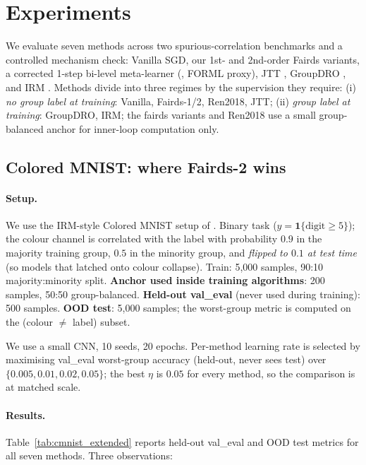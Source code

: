 \section{Experiments}
\label{sec:experiments}

We evaluate seven methods across two spurious-correlation benchmarks
and a controlled mechanism check: Vanilla SGD, our 1st- and 2nd-order
Fairds variants, a corrected 1-step bi-level meta-learner
(\citealt{ren2018reweight}, FORML proxy), JTT \citep{liu2021jtt},
GroupDRO \citep{sagawa2020groupdro}, and IRM \citep{arjovsky2019irm}.
Methods divide into three regimes by the supervision they require:
(i) \emph{no group label at training}: Vanilla, Fairds-1/2, Ren2018,
JTT; (ii) \emph{group label at training}: GroupDRO, IRM; the
fairds variants and Ren2018 use a small group-balanced anchor for
inner-loop computation only.

\subsection{Colored MNIST: where Fairds-2 wins}
\label{sec:exp:cmnist}

\paragraph{Setup.}
We use the IRM-style Colored MNIST setup of \citet{arjovsky2019irm}.
Binary task ($y = \mathbf{1}\{\mathrm{digit} \geq 5\}$); the colour
channel is correlated with the label with probability $0.9$ in the
majority training group, $0.5$ in the minority group, and \emph{flipped
to $0.1$ at test time} (so models that latched onto colour collapse).
Train: 5{,}000 samples, 90:10 majority:minority split.
\textbf{Anchor used inside training algorithms}: 200 samples, 50:50
group-balanced. \textbf{Held-out val\_eval} (never used during training):
500 samples. \textbf{OOD test}: 5{,}000 samples; the worst-group metric
is computed on the (colour $\neq$ label) subset.

We use a small CNN, 10 seeds, 20 epochs. Per-method learning rate is
selected by maximising val\_eval worst-group accuracy (held-out, never
sees test) over $\{0.005, 0.01, 0.02, 0.05\}$; the best $\eta$ is $0.05$
for every method, so the comparison is at matched scale.

\paragraph{Results.}
Table~\ref{tab:cmnist_extended} reports held-out val\_eval and OOD test
metrics for all seven methods. Three observations:

